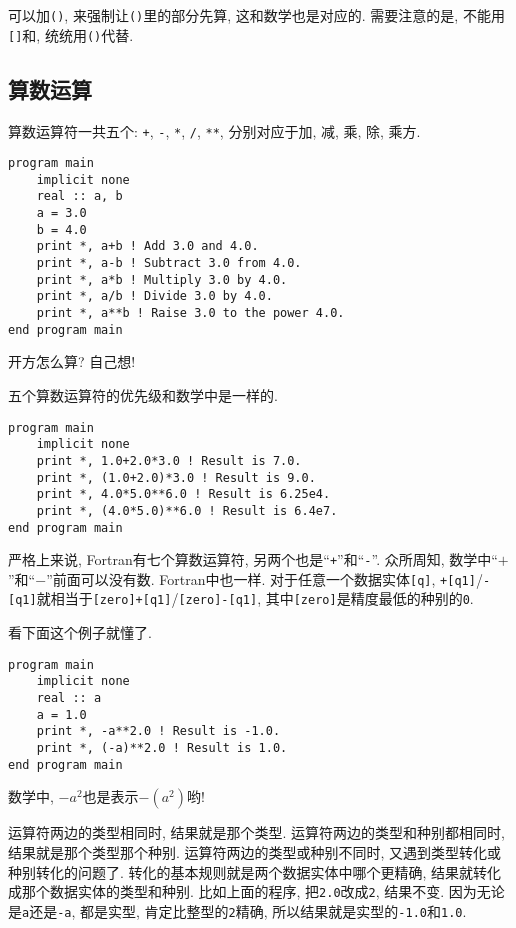 可以加\texttt{()}, 来强制让\texttt{()}里的部分先算, 这和数学也是对应的. 需要注意的是, 不能用\texttt{[]}和\texttt{{}}, 统统用\texttt{()}代替.

\subsection{算数运算}\label{fortran_numeric_operator}

算数运算符一共五个: \texttt{+}, \texttt{-}, \texttt{*}, \texttt{/}, \texttt{**}, 分别对应于加, 减, 乘, 除, 乘方.
\begin{lstlisting}
program main
    implicit none
    real :: a, b
    a = 3.0
    b = 4.0
    print *, a+b ! Add 3.0 and 4.0.
    print *, a-b ! Subtract 3.0 from 4.0.
    print *, a*b ! Multiply 3.0 by 4.0.
    print *, a/b ! Divide 3.0 by 4.0.
    print *, a**b ! Raise 3.0 to the power 4.0.
end program main
\end{lstlisting}

开方怎么算? 自己想!

五个算数运算符的优先级和数学中是一样的.
\begin{lstlisting}
program main
    implicit none
    print *, 1.0+2.0*3.0 ! Result is 7.0.
    print *, (1.0+2.0)*3.0 ! Result is 9.0.
    print *, 4.0*5.0**6.0 ! Result is 6.25e4.
    print *, (4.0*5.0)**6.0 ! Result is 6.4e7.
end program main
\end{lstlisting}

严格上来说, Fortran有七个算数运算符, 另两个也是``\texttt{+}''和``\texttt{-}''. 众所周知, 数学中``$+$''和``$-$''前面可以没有数. Fortran中也一样. 对于任意一个数据实体\texttt{[q]}, \texttt{+[q1]}/\texttt{-[q1]}就相当于\texttt{[zero]+[q1]}/\texttt{[zero]-[q1]}, 其中\texttt{[zero]}是精度最低的种别的\texttt{0}.

看下面这个例子就懂了.
\begin{lstlisting}
program main
    implicit none
    real :: a
    a = 1.0
    print *, -a**2.0 ! Result is -1.0.
    print *, (-a)**2.0 ! Result is 1.0.
end program main
\end{lstlisting}

数学中, $-a^2$也是表示$-(a^2)$哟!

运算符两边的类型相同时, 结果就是那个类型. 运算符两边的类型和种别都相同时, 结果就是那个类型那个种别. 运算符两边的类型或种别不同时, 又遇到类型转化或种别转化的问题了. 转化的基本规则就是两个数据实体中哪个更精确, 结果就转化成那个数据实体的类型和种别. 比如上面的程序, 把\texttt{2.0}改成\texttt{2}, 结果不变. 因为无论是\texttt{a}还是\texttt{-a}, 都是实型, 肯定比整型的\texttt{2}精确, 所以结果就是实型的\texttt{-1.0}和\texttt{1.0}.

